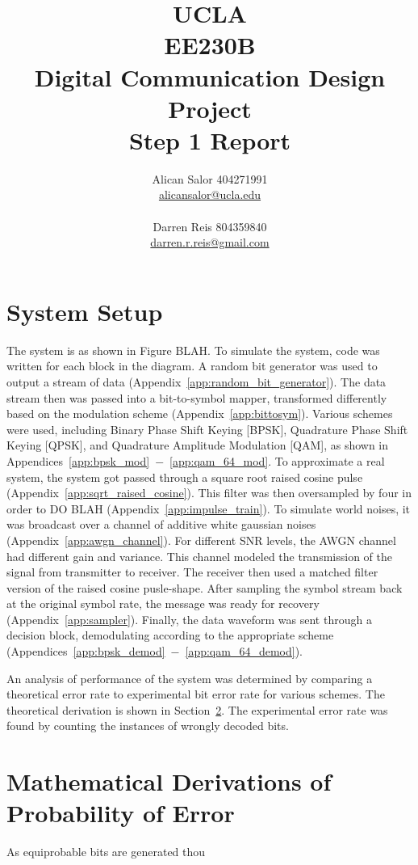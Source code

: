 \documentclass[]{article}
\title{UCLA\\EE230B\\Digital Communication Design Project\\Step 1 Report}
\author{Alican Salor 404271991 \\  \href{mailto:alicansalor@ucla.edu}{alicansalor@ucla.edu} \\ \\
Darren Reis 804359840 \\
\href{mailto:darrer.r.reis@gmail.com}{darren.r.reis@gmail.com} }
\begin{document}
\maketitle

\newpage
\tableofcontents

\newpage


\section{System Setup}
\label{sec:setup}
The system is as shown in Figure BLAH.  To simulate the system, code was written for each block in the diagram.  A random bit generator was used to output a stream of data (Appendix~\ref{app:random_bit_generator}).  The data stream then was passed into a bit-to-symbol mapper, transformed differently based on the modulation scheme (Appendix~\ref{app:bittosym}).  Various schemes were used, including Binary Phase Shift Keying [BPSK], Quadrature Phase Shift Keying [QPSK], and Quadrature Amplitude Modulation [QAM], as shown in Appendices~\ref{app:bpsk_mod}~$-$~\ref{app:qam_64_mod}. To approximate a real system, the system got passed through a square root raised cosine pulse (Appendix~\ref{app:sqrt_raised_cosine}).  This filter was then oversampled by four in order to DO BLAH (Appendix~\ref{app:impulse_train}).  To simulate world noises, it was broadcast over a channel of additive white gaussian noises (Appendix~\ref{app:awgn_channel}).  For different SNR levels, the AWGN channel had different gain and variance.  This channel modeled the transmission of the signal from transmitter to receiver.  The receiver then used a matched filter version of the raised cosine pusle-shape.  After sampling the symbol stream back at the original symbol rate, the message was ready for recovery (Appendix~\ref{app:sampler}).  Finally, the data waveform was sent through a decision block, demodulating according to the appropriate scheme (Appendices~\ref{app:bpsk_demod}~$-$~\ref{app:qam_64_demod}).  

An analysis of performance of the system was determined by comparing a theoretical error rate to experimental bit error rate for various schemes.  The theoretical derivation is shown in Section~\ref{sec:deriv}.  The experimental error rate was found by counting the instances of wrongly decoded bits.  

\section{Mathematical Derivations of Probability of Error}
\label{sec:deriv}
As equiprobable bits are generated thou
\end{document}

